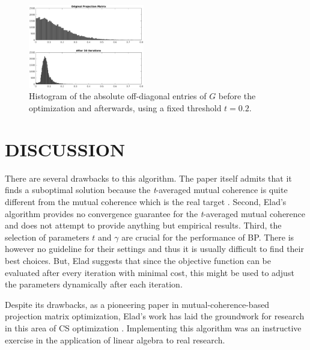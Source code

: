 \documentclass[journal]{IEEEtran}
\begin{document}
\begin{figure}[]
  \centering
  \includegraphics[width=0.45\textwidth]{hist_bw.eps}
  \caption{Histogram of the absolute off-diagonal entries of $G$ before the optimization and afterwards, using a fixed threshold $t = 0.2$.}
  \label{fig:hist}
\end{figure}

\section{DISCUSSION}

There are several drawbacks to this algorithm.  The paper itself admits that it finds a suboptimal solution because the \emph{t}-averaged mutual coherence is quite different from the mutual coherence which is the real target \cite{lin}.  Second, Elad's algorithm provides no convergence guarantee for the \emph{t}-averaged mutual coherence and does not attempt to provide anything but empirical results.  Third, the selection of parameters $t$ and $\gamma$ are crucial for the performance of BP.  There is however no guideline for their settings and thus it is usually difficult to find their best choices.  But, Elad suggests that since the objective function can be evaluated after every iteration with minimal cost, this might be used to adjust the parameters dynamically after each iteration.

Despite its drawbacks, as a pioneering paper in mutual-coherence-based projection matrix optimization, Elad's work has laid the groundwork for research in this area of CS optimization \cite{tcs}.  Implementing this algorithm was an instructive exercise in the application of linear algebra to real research.


{}
\end{document}
